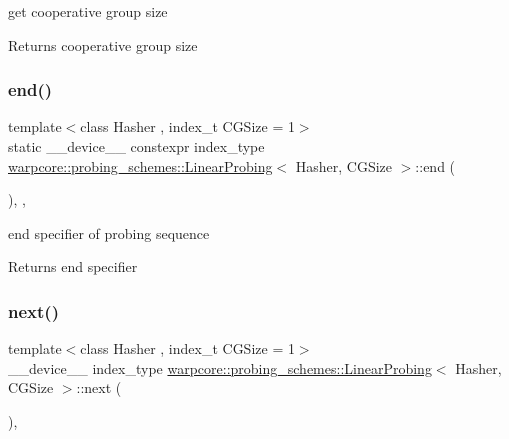 get cooperative group size 

\begin{DoxyReturn}{Returns}
cooperative group size 
\end{DoxyReturn}
\mbox{\label{classwarpcore_1_1probing__schemes_1_1LinearProbing_a3976a90f43e45fcc3438a15417803d88}} 
\subsubsection{\texorpdfstring{end()}{end()}}
{\footnotesize\ttfamily template$<$class Hasher , index\+\_\+t C\+G\+Size = 1$>$ \\
static \+\_\+\+\_\+device\+\_\+\+\_\+ constexpr index\+\_\+type \hyperlink{classwarpcore_1_1probing__schemes_1_1LinearProbing}{warpcore\+::probing\+\_\+schemes\+::\+Linear\+Probing}$<$ Hasher, C\+G\+Size $>$\+::end (\begin{DoxyParamCaption}{ }\end{DoxyParamCaption})\hspace{0.3cm}{\ttfamily [inline]}, {\ttfamily [static]}, {\ttfamily [noexcept]}}



end specifier of probing sequence 

\begin{DoxyReturn}{Returns}
end specifier 
\end{DoxyReturn}
\mbox{\label{classwarpcore_1_1probing__schemes_1_1LinearProbing_ad984d7ad47f44ada91df47f135473176}} 
\subsubsection{\texorpdfstring{next()}{next()}}
{\footnotesize\ttfamily template$<$class Hasher , index\+\_\+t C\+G\+Size = 1$>$ \\
\+\_\+\+\_\+device\+\_\+\+\_\+ index\+\_\+type \hyperlink{classwarpcore_1_1probing__schemes_1_1LinearProbing}{warpcore\+::probing\+\_\+schemes\+::\+Linear\+Probing}$<$ Hasher, C\+G\+Size $>$\+::next (\begin{DoxyParamCaption}{ }\end{DoxyParamCaption})\hspace{0.3cm}{\ttfamily [inline]}, {\ttfamily [noexcept]}}




